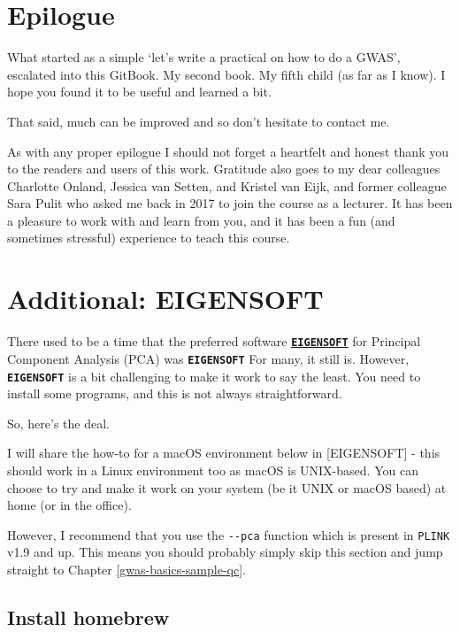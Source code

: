 \documentclass[
]{book}
\newcommand{\passthrough}[1]{#1}
\begin{document}
\hypertarget{epilogue}{%
\chapter{Epilogue}\label{epilogue}}

What started as a simple `let's write a practical on how to do a GWAS', escalated into this GitBook. My second book. My fifth child (as far as I know). I hope you found it to be useful and learned a bit.

That said, much can be improved and so don't hesitate to contact me.

As with any proper epilogue I should not forget a heartfelt and honest thank you to the readers and users of this work. Gratitude also goes to my dear colleagues Charlotte Onland, Jessica van Setten, and Kristel van Eijk, and former colleague Sara Pulit who asked me back in 2017 to join the course as a lecturer. It has been a pleasure to work with and learn from you, and it has been a fun (and sometimes stressful) experience to teach this course.

\hypertarget{eigensoft}{%
\chapter{Additional: EIGENSOFT}\label{eigensoft}}

There used to be a time that the preferred software \textbf{\href{https://github.com/DReichLab/EIG}{\passthrough{\lstinline!EIGENSOFT!}}} for Principal Component Analysis (PCA) was \textbf{\passthrough{\lstinline!EIGENSOFT!}} For many, it still is. However, \textbf{\passthrough{\lstinline!EIGENSOFT!}} is a bit challenging to make it work to say the least. You need to install some programs, and this is not always straightforward.

So, here's the deal.

I will share the how-to for a macOS environment below in {[}EIGENSOFT{]} - this should work in a Linux environment too as macOS is UNIX-based. You can choose to try and make it work on your system (be it UNIX or macOS based) at home (or in the office).

However, I recommend that you use the \passthrough{\lstinline!--pca!} function which is present in \passthrough{\lstinline!PLINK!} v1.9 and up. This means you should probably simply skip this section and jump straight to Chapter \ref{gwas-basics-sample-qc}.

\hypertarget{install-homebrew}{%
\section{Install homebrew}\label{install-homebrew}}
\end{document}
